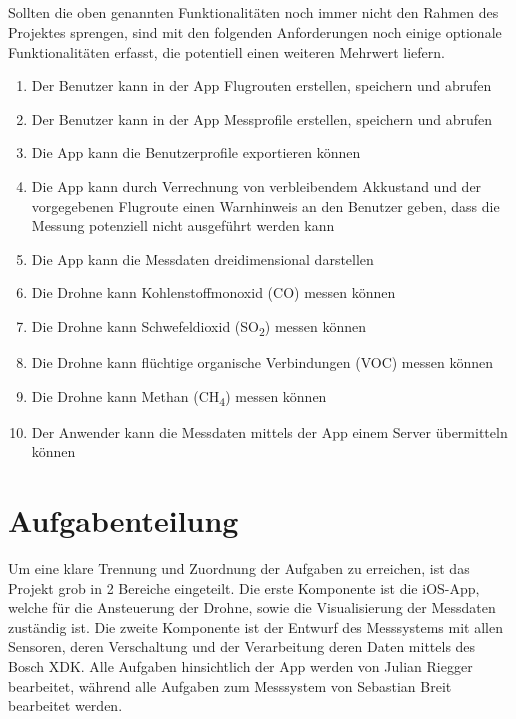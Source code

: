 \subsection{}
Sollten die oben genannten Funktionalitäten noch immer nicht den Rahmen des Projektes sprengen, sind mit den folgenden Anforderungen noch einige optionale Funktionalitäten erfasst, die potentiell einen weiteren Mehrwert liefern.
\newline
\begin{enumerate}[label=\roman*.]
	\item Der Benutzer kann in der App Flugrouten erstellen, speichern und abrufen 
	\item Der Benutzer kann in der App Messprofile erstellen, speichern und abrufen 
	\item Die App kann die Benutzerprofile exportieren können
	\item Die App kann durch Verrechnung von verbleibendem Akkustand und der vorgegebenen Flugroute einen Warnhinweis an den Benutzer geben, dass die Messung potenziell nicht ausgeführt werden kann
	\item Die App kann die Messdaten dreidimensional darstellen
	\item Die Drohne kann Kohlenstoffmonoxid (CO) messen können
	\item Die Drohne kann Schwefeldioxid (SO\textsubscript{2}) messen können
	\item Die Drohne kann flüchtige organische Verbindungen (VOC) messen können
	\item Die Drohne kann Methan (CH\textsubscript{4}) messen können	
	\item Der Anwender kann die Messdaten mittels der App einem Server übermitteln können	
\end{enumerate}
\section{Aufgabenteilung}\label{sec:Aufgabenteilung}
Um eine klare Trennung und Zuordnung der Aufgaben zu erreichen, ist das Projekt grob in 2 Bereiche eingeteilt. 
\newline
Die erste Komponente ist die iOS-App, welche für die Ansteuerung der Drohne, sowie die Visualisierung der Messdaten zuständig ist.
\newline
Die zweite Komponente ist der Entwurf des Messsystems mit allen Sensoren, deren Verschaltung und der Verarbeitung deren Daten mittels des Bosch \acs{XDK}.
\newline
\newline
Alle Aufgaben hinsichtlich der App werden von Julian Riegger bearbeitet, während alle Aufgaben zum Messsystem von Sebastian Breit bearbeitet werden.
